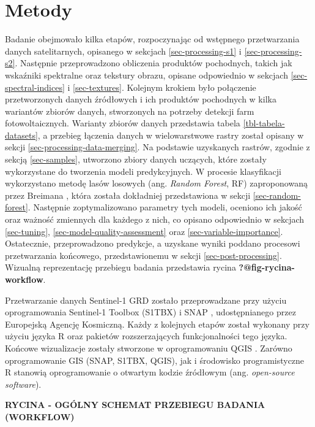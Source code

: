 \documentclass{amuthesis}
\begin{document}

\hypertarget{sec-metody}{%
\chapter{Metody}\label{sec-metody}}

Badanie obejmowało kilka etapów, rozpoczynając od wstępnego
przetwarzania danych satelitarnych, opisanego w sekcjach
\ref{sec-processing-s1} i \ref{sec-processing-s2}. Następnie
przeprowadzono obliczenia produktów pochodnych, takich jak wskaźniki
spektralne oraz tekstury obrazu, opisane odpowiednio w sekcjach
\ref{sec-spectral-indices} i \ref{sec-textures}. Kolejnym krokiem było
połączenie przetworzonych danych źródłowych i ich produktów pochodnych w
kilka wariantów zbiorów danych, stworzonych na potrzeby detekcji farm
fotowoltaicznych. Warianty zbiorów danych przedstawia tabela
\ref{tbl-tabela-datasets}, a przebieg łączenia danych w wielowarstwowe
rastry został opisany w sekcji \ref{sec-processing-data-merging}. Na
podstawie uzyskanych rastrów, zgodnie z sekcją \ref{sec-samples},
utworzono zbiory danych uczących, które zostały wykorzystane do
tworzenia modeli predykcyjnych. W procesie klasyfikacji wykorzystano
metodę lasów losowych (ang. \emph{Random Forest}, RF) zaproponowaną
przez Breimana \autocite*{breiman_2001_rf}, która została dokładniej
przedstawiona w sekcji \ref{sec-random-forest}. Następnie
zoptymalizowano parametry tych modeli, oceniono ich jakość oraz ważność
zmiennych dla każdego z nich, co opisano odpowiednio w sekcjach
\ref{sec-tuning}, \ref{sec-model-quality-assessment} oraz
\ref{sec-variable-importance}. Ostatecznie, przeprowadzono predykcje, a
uzyskane wyniki poddano procesowi przetwarzania końcowego,
przedstawionemu w sekcji \ref{sec-post-processing}. Wizualną
reprezentację przebiegu badania przedstawia rycina
\textbf{?@fig-rycina-workflow}.

Przetwarzanie danych Sentinel-1 GRD zostało przeprowadzane przy użyciu
oprogramowania Sentinel-1 Toolbox (S1TBX) \autocite{s1tbx} i SNAP
\autocite{snap}, udostępnianego przez Europejską Agencję Kosmiczną.
Każdy z kolejnych etapów został wykonany przy użyciu języka R
\autocite{R-base} oraz pakietów rozszerzających funkcjonalności tego
języka. Końcowe wizualizacje zostały stworzone w oprogramowaniu QGIS
\autocite{qgis}. Zarówno oprogramowanie GIS (SNAP, S1TBX, QGIS), jak i
środowisko programistyczne R stanowią oprogramowanie o otwartym kodzie
źródłowym (ang. \emph{open-source software}).

\textbf{RYCINA - OGÓLNY SCHEMAT PRZEBIEGU BADANIA (WORKFLOW)}
\end{document}
